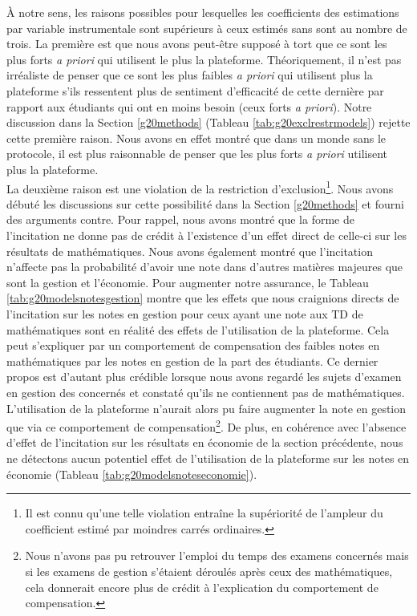 \documentclass[
]{book}
\begin{document}
À notre sens, les raisons possibles pour lesquelles les coefficients des estimations par variable instrumentale sont supérieurs à ceux estimés sans sont au nombre de trois. La première est que nous avons peut-être supposé à tort que ce sont les plus forts \emph{a priori} qui utilisent le plus la plateforme. Théoriquement, il n'est pas irréaliste de penser que ce sont les plus faibles \emph{a priori} qui utilisent plus la plateforme s'ils ressentent plus de sentiment d'efficacité de cette dernière par rapport aux étudiants qui ont en moins besoin (ceux forts \emph{a priori}). Notre discussion dans la Section \ref{g20methods} (Tableau \ref{tab:g20exclrestrmodels}) rejette cette première raison. Nous avons en effet montré que dans un monde sans le protocole, il est plus raisonnable de penser que les plus forts \emph{a priori} utilisent plus la plateforme.\\
La deuxième raison est une violation de la restriction d'exclusion\footnote{Il est connu qu'une telle violation entraîne la supériorité de l'ampleur du coefficient estimé par moindres carrés ordinaires.}. Nous avons débuté les discussions sur cette possibilité dans la Section \ref{g20methods} et fourni des arguments contre. Pour rappel, nous avons montré que la forme de l'incitation ne donne pas de crédit à l'existence d'un effet direct de celle-ci sur les résultats de mathématiques. Nous avons également montré que l'incitation n'affecte pas la probabilité d'avoir une note dans d'autres matières majeures que sont la gestion et l'économie. Pour augmenter notre assurance, le Tableau \ref{tab:g20modelsnotesgestion} montre que les effets que nous craignions directs de l'incitation sur les notes en gestion pour ceux ayant une note aux TD de mathématiques sont en réalité des effets de l'utilisation de la plateforme. Cela peut s'expliquer par un comportement de compensation des faibles notes en mathématiques par les notes en gestion de la part des étudiants. Ce dernier propos est d'autant plus crédible lorsque nous avons regardé les sujets d'examen en gestion des concernés et constaté qu'ils ne contiennent pas de mathématiques. L'utilisation de la plateforme n'aurait alors pu faire augmenter la note en gestion que via ce comportement de compensation\footnote{Nous n'avons pas pu retrouver l'emploi du temps des examens concernés mais si les examens de gestion s'étaient déroulés après ceux des mathématiques, cela donnerait encore plus de crédit à l'explication du comportement de compensation.}. De plus, en cohérence avec l'absence d'effet de l'incitation sur les résultats en économie de la section précédente, nous ne détectons aucun potentiel effet de l'utilisation de la plateforme sur les notes en économie (Tableau \ref{tab:g20modelsnoteseconomie}).
\end{document}
